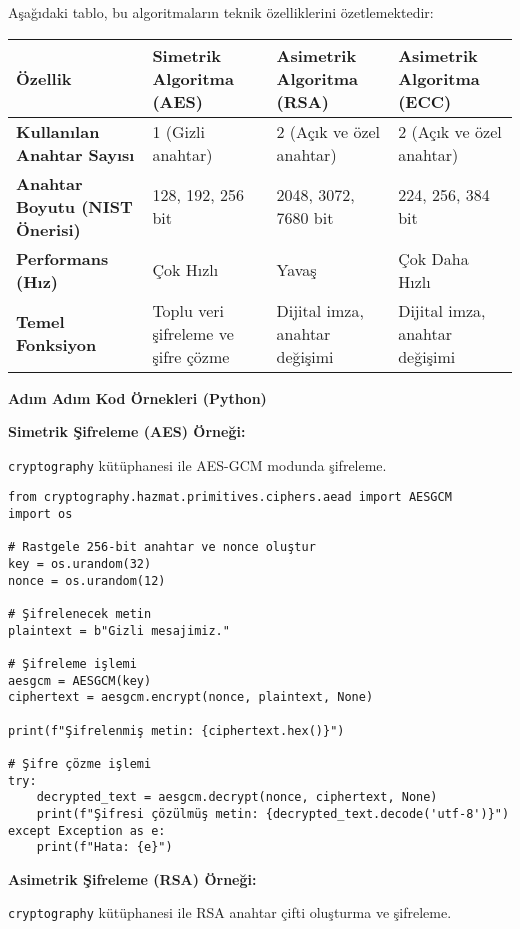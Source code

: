 Aşağıdaki tablo, bu algoritmaların teknik özelliklerini özetlemektedir:

\begin{tabular}{|l|l|l|l|}
\hline
\textbf{Özellik} & \textbf{Simetrik Algoritma (AES)} & \textbf{Asimetrik Algoritma (RSA)} & \textbf{Asimetrik Algoritma (ECC)} \\
\hline
\textbf{Kullanılan Anahtar Sayısı} & 1 (Gizli anahtar) & 2 (Açık ve özel anahtar) & 2 (Açık ve özel anahtar) \\
\hline
\textbf{Anahtar Boyutu (NIST Önerisi)} & 128, 192, 256 bit & 2048, 3072, 7680 bit & 224, 256, 384 bit \\
\hline
\textbf{Performans (Hız)} & Çok Hızlı & Yavaş & Çok Daha Hızlı \\
\hline
\textbf{Temel Fonksiyon} & Toplu veri şifreleme ve şifre çözme & Dijital imza, anahtar değişimi & Dijital imza, anahtar değişimi \\
\hline
\end{tabular}

\textbf{Adım Adım Kod Örnekleri (Python)}

\textbf{Simetrik Şifreleme (AES) Örneği:}

\texttt{cryptography} kütüphanesi ile AES-GCM modunda şifreleme.

\begin{verbatim}
from cryptography.hazmat.primitives.ciphers.aead import AESGCM
import os
 
# Rastgele 256-bit anahtar ve nonce oluştur
key = os.urandom(32)
nonce = os.urandom(12)
 
# Şifrelenecek metin
plaintext = b"Gizli mesajimiz."
 
# Şifreleme işlemi
aesgcm = AESGCM(key)
ciphertext = aesgcm.encrypt(nonce, plaintext, None)
 
print(f"Şifrelenmiş metin: {ciphertext.hex()}")
 
# Şifre çözme işlemi
try:
    decrypted_text = aesgcm.decrypt(nonce, ciphertext, None)
    print(f"Şifresi çözülmüş metin: {decrypted_text.decode('utf-8')}")
except Exception as e:
    print(f"Hata: {e}")
\end{verbatim}

\textbf{Asimetrik Şifreleme (RSA) Örneği:}

\texttt{cryptography} kütüphanesi ile RSA anahtar çifti oluşturma ve şifreleme.

